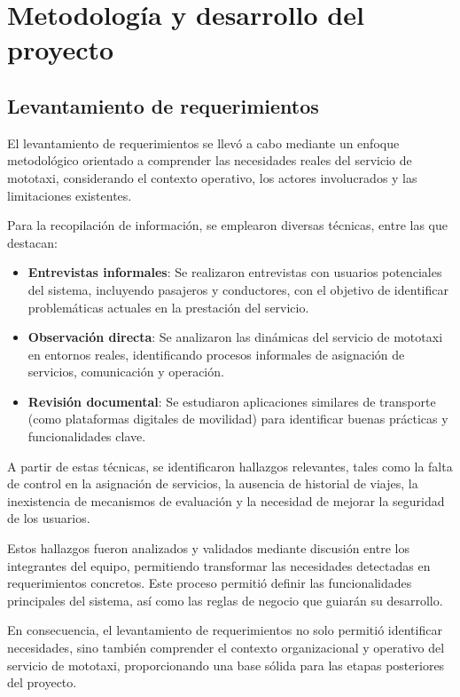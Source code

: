 \chapter{Metodología y desarrollo del proyecto}

\section{Levantamiento de requerimientos}

El levantamiento de requerimientos se llevó a cabo mediante un enfoque metodológico 
orientado a comprender las necesidades reales del servicio de mototaxi, 
considerando el contexto operativo, los actores involucrados y las limitaciones existentes.

Para la recopilación de información, se emplearon diversas técnicas, entre las que destacan:

\begin{itemize}
    \item \textbf{Entrevistas informales}: Se realizaron entrevistas con usuarios potenciales del 
    sistema, incluyendo pasajeros y conductores, con el objetivo de identificar problemáticas 
    actuales en la prestación del servicio.
    \item \textbf{Observación directa}: Se analizaron las dinámicas del servicio de mototaxi 
    en entornos reales, identificando procesos informales de asignación de servicios, 
    comunicación y operación.
    \item \textbf{Revisión documental}: Se estudiaron aplicaciones similares de transporte (como plataformas digitales de movilidad) para identificar buenas prácticas y funcionalidades clave.
\end{itemize}

A partir de estas técnicas, se identificaron hallazgos relevantes, tales como la falta de control en la asignación de servicios, la ausencia de historial de viajes, la inexistencia de mecanismos de evaluación y la necesidad de mejorar la seguridad de los usuarios.

Estos hallazgos fueron analizados y validados mediante discusión entre los integrantes del equipo, permitiendo transformar las necesidades detectadas en requerimientos concretos. Este proceso permitió definir las funcionalidades principales del sistema, así como las reglas de negocio que guiarán su desarrollo.

En consecuencia, el levantamiento de requerimientos no solo permitió identificar necesidades, sino también comprender el contexto organizacional y operativo del servicio de mototaxi, proporcionando una base sólida para las etapas posteriores del proyecto.

